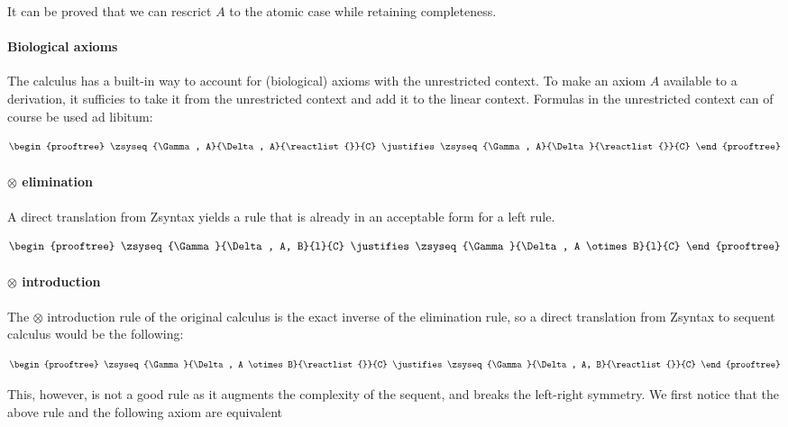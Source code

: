 It can be proved that we can rescrict $A$ to the atomic case while retaining
completeness.

\paragraph{Biological axioms}

The calculus has a built-in way to account for (biological) axioms with the
unrestricted context. To make an axiom $A$ available to a derivation, it
sufficies to take it from the unrestricted context and add it to the linear
context. Formulas in the unrestricted context can of course be used ad libitum:

\[
  \begin{prooftree}
    \zsyseq{\Gamma, A}{\Delta, A}{\reactlist{}}{C}
    \justifies
    \zsyseq{\Gamma, A}{\Delta}{\reactlist{}}{C}
  \end{prooftree}
\]

\paragraph{$\otimes$ elimination}

A direct translation from Zsyntax yields a rule that is already in an acceptable
form for a left rule.

\[
  \begin{prooftree}
    \zsyseq{\Gamma}{\Delta, A, B}{l}{C}
    \justifies
    \zsyseq{\Gamma}{\Delta, A \otimes B}{l}{C}
  \end{prooftree}
\]

\paragraph{$\otimes$ introduction}

The $\otimes$ introduction rule of the original calculus is the exact inverse of
the elimination rule, so a direct translation from Zsyntax to sequent calculus
would be the following:

\[
  \begin{prooftree}
    \zsyseq{\Gamma}{\Delta, A \otimes B}{\reactlist{}}{C}
    \justifies
    \zsyseq{\Gamma}{\Delta, A, B}{\reactlist{}}{C}
  \end{prooftree}
\]

This, however, is not a good rule as it augments the complexity of the sequent,
and breaks the left-right symmetry. We first notice that the above rule and the
following axiom are equivalent

